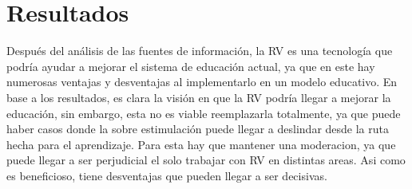 \section{Resultados}

Después del análisis de las fuentes de información, la RV es una tecnología que podría ayudar a mejorar el sistema de educación actual, ya que en este hay numerosas ventajas y desventajas al implementarlo en un modelo educativo.
En base a los resultados, es clara la visión en que la RV podría llegar a mejorar la educación, sin embargo, esta no es viable reemplazarla totalmente, ya que puede haber casos donde la sobre estimulación puede llegar a deslindar desde la ruta hecha para el aprendizaje. Para esta hay que mantener una moderacion, ya que puede llegar a ser perjudicial el solo trabajar con RV en distintas areas. Asi como es beneficioso, tiene desventajas que pueden llegar a ser decisivas.
